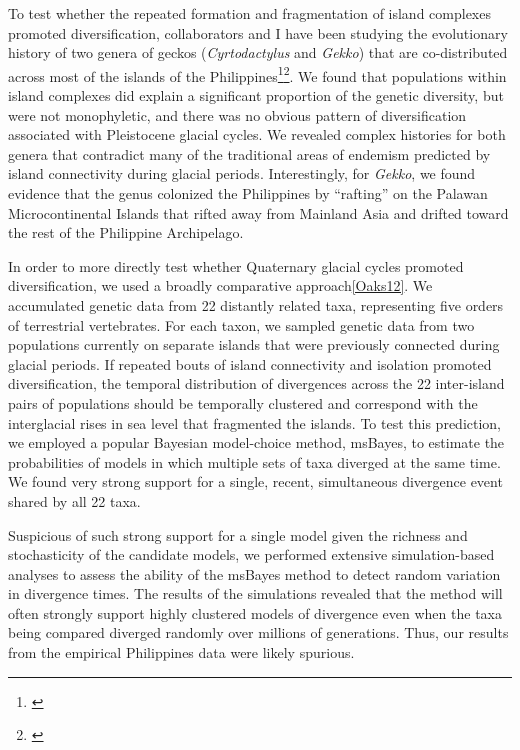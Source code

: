 To test whether the repeated formation and fragmentation of island complexes
promoted diversification, collaborators and I have been studying the
evolutionary history of two genera of geckos (\emph{Cyrtodactylus} and
\emph{Gekko}) that are co-distributed across most of the islands of the
Philippines\footnote{\label{Siler10}}\super{,}\footnote{\label{Siler12}}.
We found that populations within island complexes did explain a significant
proportion of the genetic diversity, but were not monophyletic, and there was
no obvious pattern of diversification associated with Pleistocene glacial
cycles.
We revealed complex histories for both genera that contradict many of the
traditional areas of endemism predicted by island connectivity during glacial
periods.
Interestingly, for \emph{Gekko}, we found evidence that the genus colonized the
Philippines by ``rafting'' on the Palawan Microcontinental Islands that rifted
away from Mainland Asia and drifted toward the rest of the Philippine
Archipelago.

In order to more directly test whether Quaternary glacial cycles promoted
diversification, we used a broadly comparative approach\cref{Oaks12}.
We accumulated genetic data from 22 distantly related taxa, representing five
orders of terrestrial vertebrates.
For each taxon, we sampled genetic data from two populations currently on
separate islands that were previously connected during glacial periods.
If repeated bouts of island connectivity and isolation promoted
diversification, the temporal distribution of divergences across the 22
inter-island pairs of populations should be temporally clustered and correspond
with the interglacial rises in sea level that fragmented the islands.
To test this prediction, we employed a popular Bayesian model-choice method,
msBayes, to estimate the probabilities of models in which multiple sets of taxa
diverged at the same time.
We found very strong support
for a single, recent, simultaneous divergence event shared by all 22 taxa.

Suspicious of such strong support for a single model given the richness and
stochasticity of the candidate models,
we performed extensive simulation-based analyses to assess the ability of the
msBayes method to detect random variation in divergence times.
The results of the simulations revealed that the method will often strongly
support highly clustered models of divergence even when the taxa being compared
diverged randomly over millions of generations.
Thus, our results from the empirical Philippines data were likely spurious.

